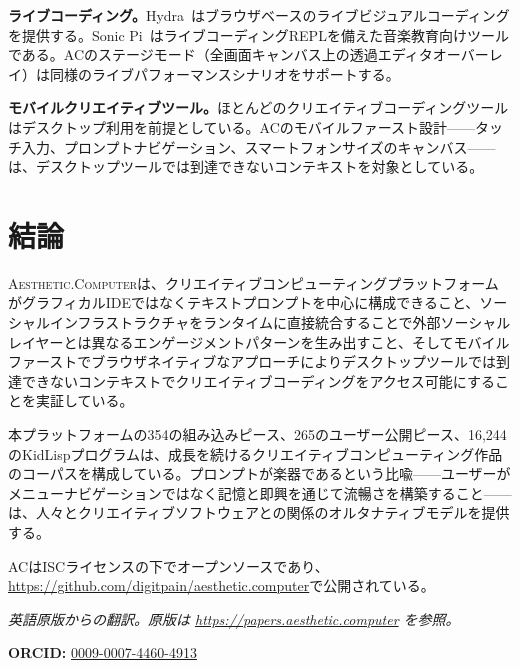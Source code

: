 \documentclass[10pt,letterpaper,twocolumn]{article}
\newcommand{\ac}{\textsc{Aesthetic.Computer}}
\begin{document}
\textbf{ライブコーディング。}Hydra~\citep{hydra2019}はブラウザベースのライブビジュアルコーディングを提供する。Sonic Pi~\citep{aaron2016sonic}はライブコーディングREPLを備えた音楽教育向けツールである。ACのステージモード（全画面キャンバス上の透過エディタオーバーレイ）は同様のライブパフォーマンスシナリオをサポートする。

\textbf{モバイルクリエイティブツール。}ほとんどのクリエイティブコーディングツールはデスクトップ利用を前提としている。ACのモバイルファースト設計——タッチ入力、プロンプトナビゲーション、スマートフォンサイズのキャンバス——は、デスクトップツールでは到達できないコンテキストを対象としている。


\section{結論}

\ac{}は、クリエイティブコンピューティングプラットフォームがグラフィカルIDEではなくテキストプロンプトを中心に構成できること、ソーシャルインフラストラクチャをランタイムに直接統合することで外部ソーシャルレイヤーとは異なるエンゲージメントパターンを生み出すこと、そしてモバイルファーストでブラウザネイティブなアプローチによりデスクトップツールでは到達できないコンテキストでクリエイティブコーディングをアクセス可能にすることを実証している。

本プラットフォームの354の組み込みピース、265のユーザー公開ピース、16,244のKidLispプログラムは、成長を続けるクリエイティブコンピューティング作品のコーパスを構成している。プロンプトが楽器であるという比喩——ユーザーがメニューナビゲーションではなく記憶と即興を通じて流暢さを構築すること——は、人々とクリエイティブソフトウェアとの関係のオルタナティブモデルを提供する。

ACはISCライセンスの下でオープンソースであり、\url{https://github.com/digitpain/aesthetic.computer}で公開されている。

\vspace{0.5em}
\noindent\textit{英語原版からの翻訳。原版は \url{https://papers.aesthetic.computer} を参照。}

\vspace{0.5em}
\noindent\textbf{ORCID:} \href{https://orcid.org/0009-0007-4460-4913}{0009-0007-4460-4913}




\end{document}
